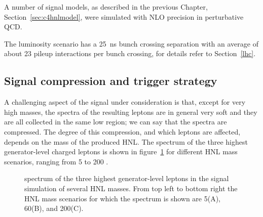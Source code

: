 A number of signal models, as described in the previous
Chapter, Section~\ref{sec:c4hnlmodel}, were simulated with NLO precision in
perturbative QCD. 

The luminosity scenario has a 25~ns bunch crossing separation with an
average of about 23 pileup interactions per bunch
crossing, for details refer to Section~\ref{lhc}.

\subsection{Signal compression and trigger strategy}\label{sec:compression}
A challenging aspect of the signal under consideration is that, except
for very high masses, the \pt
spectra of the resulting leptons are in general very soft and they are
all collected in the same low \pt region; we can say that the \pt
spectra are compressed. The degree of this compression, and which
leptons are affected, depends on the mass of the produced HNL. The \pt
spectrum of the three highest \pt generator-level charged leptons is shown in figure~\ref{fig:genPt} for different HNL mass scenarios, ranging from 5 to 200 \GeV . 

\begin{figure}[h]
\noindent
{}
\caption{\pt spectrum of the three highest generator-level leptons in
  the signal simulation of several HNL masses. From top left to bottom
  right the HNL mass scenarios for which the spectrum is shown are
  5\GeV (A), 60\GeV (B), and 200\GeV (C). \willem}
\label{fig:genPt}
\end{figure}

